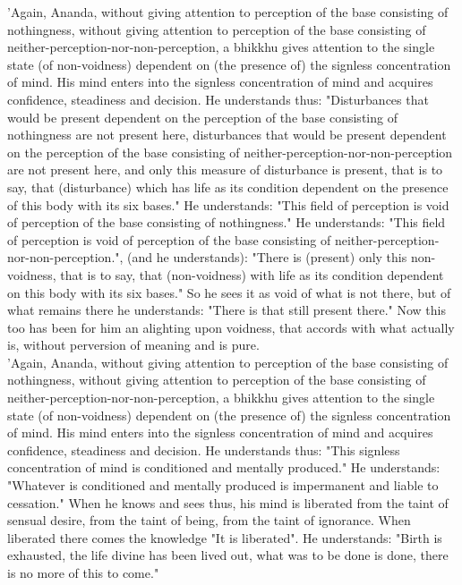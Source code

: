 \documentclass[11pt]{article}
\begin{document}
 'Again, Ananda, without giving attention to perception of the base consisting of nothingness, without giving attention to perception of the base consisting of neither-perception-nor-non-perception, a bhikkhu gives attention to the single state (of non-voidness) dependent on (the presence of) the signless concentration of mind. His mind enters into the signless concentration of mind and acquires confidence, steadiness and decision. He understands thus: "Disturbances that would be present dependent on the perception of the base consisting of nothingness are not present here, disturbances that would be present dependent on the perception of the base consisting of neither-perception-nor-non-perception are not present here, and only this measure of disturbance is present, that is to say, that (disturbance) which has life as its condition dependent on the presence of this body with its six bases." He understands: "This field of perception is void of perception of the base consisting of nothingness." He understands: "This field of perception is void of perception of the base consisting of neither-perception-nor-non-perception.", (and he understands): "There is (present) only this non-voidness, that is to say, that (non-voidness) with life as its condition dependent on this body with its six bases." So he sees it as void of what is not there, but of what remains there he understands: "There is that still present there." Now this too has been for him an alighting upon voidness, that accords with what actually is, without perversion of meaning and is pure.\\

 'Again, Ananda, without giving attention to perception of the base consisting of nothingness, without giving attention to perception of the base consisting of neither-perception-nor-non-perception, a bhikkhu gives attention to the single state (of non-voidness) dependent on (the presence of) the signless concentration of mind. His mind enters into the signless concentration of mind and acquires confidence, steadiness and decision. He understands thus: "This signless concentration of mind is conditioned and mentally produced." He understands: "Whatever is conditioned and mentally produced is impermanent and liable to cessation." When he knows and sees thus, his mind is liberated from the taint of sensual desire, from the taint of being, from the taint of ignorance. When liberated there comes the knowledge "It is liberated". He understands: "Birth is exhausted, the life divine has been lived out, what was to be done is done, there is no more of this to come."\\
\end{document}
